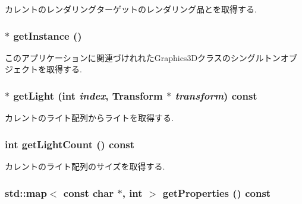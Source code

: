 カレントのレンダリングターゲットのレンダリング品とを取得する. \hypertarget{classm3g_1_1Graphics3D_da6d71754bfe755dd8204a9332e9ed47}{
\subsubsection[{getInstance}]{ $\ast$ getInstance ()}}
\label{classm3g_1_1Graphics3D_da6d71754bfe755dd8204a9332e9ed47}


このアプリケーションに関連づけれれたGraphics3Dクラスのシングルトンオブジェクトを取得する. \hypertarget{classm3g_1_1Graphics3D_02e7b19ae5c0342b11f2cbf9a4df4d77}{
\subsubsection[{getLight}]{ $\ast$ getLight (int {\em index}, \/  {\bf Transform} $\ast$ {\em transform}) const}}
\label{classm3g_1_1Graphics3D_02e7b19ae5c0342b11f2cbf9a4df4d77}


カレントのライト配列からライトを取得する. \hypertarget{classm3g_1_1Graphics3D_7a08cfeb48d76ad5d8859a1fc0c77d98}{
\subsubsection[{getLightCount}]{\setlength{\rightskip}{0pt plus 5cm}int getLightCount () const}}
\label{classm3g_1_1Graphics3D_7a08cfeb48d76ad5d8859a1fc0c77d98}


カレントのライト配列のサイズを取得する. \hypertarget{classm3g_1_1Graphics3D_2ea2a069c4b10555d50a193a44e63996}{
\subsubsection[{getProperties}]{\setlength{\rightskip}{0pt plus 5cm}std::map$<$ const char $\ast$, int $>$ getProperties () const}}
\label{classm3g_1_1Graphics3D_2ea2a069c4b10555d50a193a44e63996}



